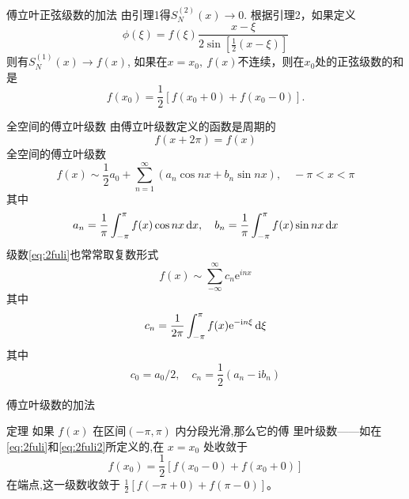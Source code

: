 \documentclass[10pt]{beamer}
\newcommand\mi{\mathrm{i}}
\newcommand\me{\mathrm{e}}
\begin{document}
\begin{frame}[allowframebreaks]{傅立叶正弦级数的加法}
由引理1得$S_{N}^{(2)}(x)\to 0$. 根据引理2，如果定义
\begin{equation}
  \phi(\xi)=f(\xi) \frac{x-\xi}{2 \sin \left[\frac{1}{2}(x-\xi)\right]}
\end{equation}
则有$S_{N}^{(1)}(x)\to f(x)$, 如果在$x=x_0,\ f(x)$不连续，则在$x_0$处的正弦级数的和是
\begin{equation}
  f\left(x_{0}\right)=\frac{1}{2}\left[f\left(x_{0}+0\right)+f\left(x_{0}-0\right)\right].
\end{equation}

\end{frame}

\begin{frame}[allowframebreaks]{全空间的傅立叶级数}
  由傅立叶级数定义的函数是周期的
  \begin{equation}
    f(x+2 \pi)=f(x)
  \end{equation}
  全空间的傅立叶级数
  \begin{equation}
    f(x) \sim \frac{1}{2} a_{0}+\sum_{n=1}^{\infty}\left(a_{n} \cos n x+b_{n} \sin n x\right),\quad -\pi<x<\pi
    \label{eq:2fuli}
  \end{equation}
  其中
  \begin{equation}
    a_{n}=\frac{1}{\pi} \int_{-\pi}^{\pi} f(x) \cos n x \dif x, \quad b_{n}=\frac{1}{\pi} \int_{-\pi}^{\pi} f(x) \sin n x \dif x
    \label{eq:2fuli2}
  \end{equation}
  级数\cref{eq:2fuli}也常常取复数形式
\begin{equation}
  f(x) \sim \sum_{-\infty}^{\infty} c_{n} \me^{i n x}
\end{equation}
其中
\begin{equation}
  c_{n}=\frac{1}{2 \pi} \int_{-\pi}^{\pi} f(x) \me^{-\mi n \xi} \dif \xi
\end{equation}
其中
\begin{equation}
  c_{0}=a_{0} / 2, \quad c_{n}=\frac{1}{2}\left(a_{n}-\mi b_{n}\right)
\end{equation}
\end{frame}

\begin{frame}{傅立叶级数的加法}

  \begin{block}{定理}
  如果 $f(x)$ 在区间$(-\pi, \pi)$ 内分段光滑,那么它的傅 里叶级数——如在\cref{eq:2fuli}和\cref{eq:2fuli2}所定义的,在 $x=x_{0}$ 处收敛于
  \begin{equation}
    f\left(x_{0}\right)=\frac{1}{2}\left[f\left(x_{0}-0\right)+f\left(x_{0}+0\right)\right]
  \end{equation}
在端点,这一级数收敛于 $\frac{1}{2}[f(-\pi+0)+f(\pi-0)]$。
  \end{block}
\end{frame}
\end{document}
